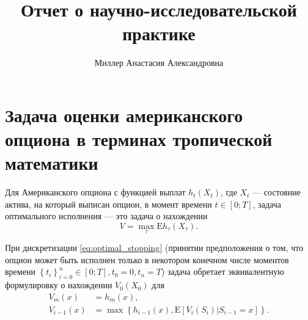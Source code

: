 \documentclass[specialist,
               substylefile = ../spbu.rtx,
               subf,href,colorlinks=true, 12pt]{disser}
\newcommand{\ev}{\mathrm{E}}
\begin{document}
%
%


\title{Отчет о научно-исследовательской практике}


\author{Миллер Анастасия Александровна}


\date{\number\year}

\maketitle

\chapter{Задача оценки американского опциона в терминах тропической математики}
Для Американского опциона с функцией выплат $h_t\left(X_t\right)$, где $X_t$ — состояние актива, на который выписан опцион, в момент времени $t\in\left[0;T\right]$, задача оптимального исполнения — это задача о нахождении \begin{equation}\label{eq:optimal_stopping}V = \max_{\tau} \ev h_\tau\left(X_\tau\right).\end{equation}

При дискретизации \eqref{eq:optimal_stopping} (принятии предположения о том, что опцион может быть исполнен только в некотором конечном числе моментов времени $\left\lbrace t_i\right\rbrace_{i=0}^n \in \left[0;T\right], t_0 = 0, t_n = T$) задача обретает эквивалентную формулировку о нахождении $V_0\left(X_0\right)$ для 
\begin{equation}\label{eq:option-recursive}\begin{aligned}
			V_m\left(x\right) &= h_m\left(x\right), \\
			V_{i-1}\left(x\right) &= \max\left\lbrace h_{i-1}\left(x\right), \ev\left[V_i\left(S_i\right)|S_{i-1}=x\right]\right\rbrace.
\end{aligned}\end{equation}
\end{document}

